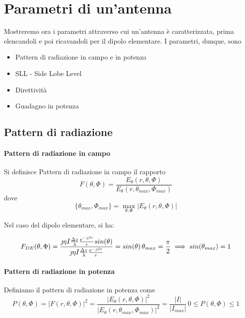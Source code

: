 \section{Parametri di un'antenna}
Mostreremo ora i parametri attraverso cui un'antenna è caratterizzata, prima elencandoli e poi ricavandoli per il dipolo elementare.
I parametri, dunque, sono
\begin{itemize}
  \item Pattern di radiazione in campo e in potenza
  \item SLL - Side Lobe Level
  \item Direttività
  \item Guadagno in potenza
\end{itemize}

\subsection{Pattern di radiazione}
\paragraph{Pattern di radiazione in campo}
Si definisce Pattern di radiazione in campo il rapporto
\begin{equation} \label{eq:patternCampo}
  F(\theta,\Phi) = \frac{E_\theta(r,\theta,\Phi)}{E_\theta(r,\theta_{max},\Phi_{max})}
\end{equation}
dove
\begin{equation}
  \{\theta_{max} , \Phi_{max}\} = \max_{\theta,\Phi} |E_\theta(r,\theta,\Phi)|
\end{equation}

Nel caso del dipolo elementare, si ha:

\begin{equation}
  F_{DE}(\theta,\Phi) = \frac{\jmath\eta I \frac{\Delta z}{\lambda} \frac{e^{-\jmath \beta r}}{r} sin(\theta)}{\jmath\eta I \frac{\Delta z}{\lambda} \frac{e^{-\jmath \beta r}}{r}} = sin(\theta) \, \theta_{max}=\frac{\pi}{2} \implies sin(\theta_{max}) =1
\end{equation}


\paragraph{Pattern di radiazione in potenza}
Definiamo il pattern di radiazione in potenza come
\begin{equation}\label{eq:patternPotenza}
  P(\theta,\Phi) = |F(r,\theta,\Phi)|^2 = \frac{|E_\theta(r,\theta,\Phi)|^2}{|E_\theta(r,\theta_{max},\Phi_{max})|^2} = \frac{|I|}{|I_{max}|} \, 0\le P(\theta,\Phi) \le 1
\end{equation}


